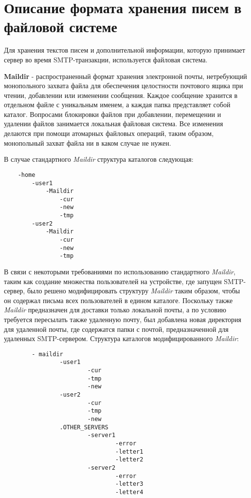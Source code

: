\documentclass[a4paper,12pt]{report}
\begin{document}
	\section{Описание формата хранения писем в файловой системе}
    	
	Для хранения текстов писем и дополнительной информации, которую принимает сервер во время SMTP-транзакции,
	 используется файловая система.
	
	\textbf{Maildir} - распространенный формат хранения электронной почты, 
	нетребующий монопольного захвата файла для обеспечения целостности почтового ящика при чтении, 
	добавлении или изменении сообщения. Каждое сообщение хранится в отдельном файле с уникальным именем, 
	а каждая папка представляет собой каталог. Вопросами блокировки файлов при добавлении, 
	перемещении и удалении файлов занимается локальная файловая система. 
	Все изменения делаются при помощи атомарных файловых операций, таким образом, монопольный захват файла 
	ни в каком случае не нужен.

	В случае стандартного \textit{Maildir} структура каталогов следующая:
	\begin{Verbatim}
	-home
		-user1
			-Maildir
				-cur
				-new
				-tmp
		-user2
			-Maildir
				-cur
				-new
				-tmp

	\end{Verbatim}

	В связи с некоторыми требованиями по использованию стандартного \textit{Maildir}, 
	таким как создание множества пользователей на устройстве, где запущен SMTP-сервер, 
	было решено модифицировать структуру \textit{Maildir} таким образом, 
	чтобы он содержал письма всех пользователей в едином каталоге.
	 Поскольку также \textit{Maildir} предназначен для доставки только локальной почты,
	  а по условию требуется пересылать также удаленную почту,
	   был добавлена новая директория для удаленной почты, 
	   где содержатся папки с почтой, предназначенной для удаленных SMTP-сервером. 
	   Структура каталогов модифицированного \textit{Maildir}:
        
    	\begin{verbatim}
        - maildir
               	-user1
                       	-cur
                       	-tmp
                       	-new
               	-user2
                       	-cur
                       	-tmp
                       	-new
               	.OTHER_SERVERS
                       	-server1
                               	-error
                               	-letter1
                               	-letter2
                       	-server2
                               	-error
                               	-letter3
                               	-letter4
    	\end{verbatim}
\end{document}
